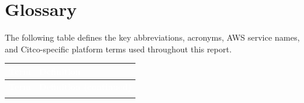 
\section{Glossary}
\label{sec:glossary}

The following table defines the key abbreviations, acronyms, AWS service names, and
Citco-specific platform terms used throughout this report.

\vspace{0.5em}

\begingroup
\setlength{\tabcolsep}{6pt}
\renewcommand{\arraystretch}{1.3}
{
\begin{longtable}{@{\hspace{\tabcolsep}}>{\bfseries}p{}p{}@{\hspace{\tabcolsep}}}

\hline
\rowcolor{smubrand}\textcolor{white}{\textbf{Term}} & \textcolor{white}{\textbf{Definition}} \\
\hline
\endfirsthead

\hline
\rowcolor{smubrand}\textcolor{white}{\textbf{Term}} & \textcolor{white}{\textbf{Definition (continued)}} \\
\hline
\endhead

\hline
\endfoot


\end{longtable}}
